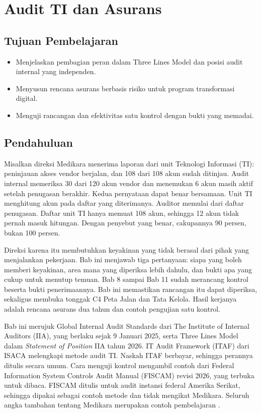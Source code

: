 \chapter{Audit TI dan Asurans}

\section*{Tujuan Pembelajaran}
\begin{itemize}
  \item Menjelaskan pembagian peran dalam Three Lines Model dan posisi audit internal yang
  independen.
  \item Menyusun rencana asurans berbasis risiko untuk program transformasi digital.
  \item Menguji rancangan dan efektivitas satu kontrol dengan bukti yang memadai.
\end{itemize}

\section{Pendahuluan}

Misalkan direksi Medikara menerima laporan dari unit Teknologi Informasi (TI): peninjauan
akses vendor berjalan, dan 108 dari 108 akun sudah ditinjau. Audit internal memeriksa 30 dari
120 akun vendor dan menemukan 6 akun masih aktif setelah penugasan berakhir. Kedua pernyataan
dapat benar bersamaan. Unit TI menghitung akun pada daftar yang diterimanya. Auditor memulai
dari daftar penugasan. Daftar unit TI hanya memuat 108 akun, sehingga 12 akun tidak pernah
masuk hitungan. Dengan penyebut yang benar, cakupannya 90 persen, bukan 100 persen.

Direksi karena itu membutuhkan keyakinan yang tidak berasal dari pihak yang menjalankan
pekerjaan. Bab ini menjawab tiga pertanyaan: siapa yang boleh memberi keyakinan, area mana yang
diperiksa lebih dahulu, dan bukti apa yang cukup untuk menutup temuan. Bab 8 sampai Bab 11 sudah
merancang kontrol beserta bukti penerimaannya. Bab ini memastikan rancangan itu dapat diperiksa,
sekaligus membuka tonggak C4 Peta Jalan dan Tata Kelola. Hasil kerjanya adalah rencana asurans
dua tahun dan contoh pengujian satu kontrol.

Bab ini merujuk Global Internal Audit Standards dari The Institute of Internal Auditors (IIA),
yang berlaku sejak 9 Januari 2025, serta Three Lines Model dalam \textit{Statement of Position}
IIA tahun 2026. IT Audit Framework (ITAF) dari ISACA melengkapi metode audit TI. Naskah ITAF
berbayar, sehingga perannya ditulis secara umum. Cara menguji kontrol mengambil contoh dari
Federal Information System Controls Audit Manual (FISCAM) revisi 2026, yang terbuka untuk
dibaca. FISCAM ditulis untuk audit instansi federal Amerika Serikat, sehingga dipakai sebagai
contoh metode dan tidak mengikat Medikara. Seluruh angka tambahan tentang Medikara merupakan
contoh pembelajaran \cite{iia-gias2024,iia-tlm2026,c12-itaf,c12-fiscam2026}.

